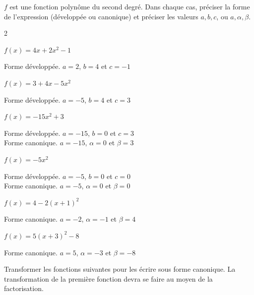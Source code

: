 \documentclass[11pt,a4paper]{article}  %
\begin{document}
$f$ est une fonction polynôme du second degré. Dans chaque cas, préciser la forme de l'expression (développée ou canonique) et préciser les valeurs $a, b, c$, ou $a, \alpha, \beta$.
\begin{multicols}{2}
	\begin{enumMet}
		\item $f(x)=4 x+2 x^2-1$ \quad {}
		\begin{corrBox}
			Forme développée. $a=2$, $b=4$ et $c=-1$
		\end{corrBox}
		\item $f(x)=3+4x-5x^2$ \quad {}
		\begin{corrBox}
			Forme développée. $a=-5$, $b=4$ et $c=3$
		\end{corrBox}
		\item $f(x)=-15 x^2+3$ \quad {}
		\begin{corrBox}
			Forme développée. $a=-15$, $b=0$ et $c=3$\\
			Forme canonique. $a=-15$, $\alpha=0$ et $\beta=3$
		\end{corrBox}
		\item $f(x)=-5 x^2$ \quad {}
		\begin{corrBox}
			Forme développée. $a=-5$, $b=0$ et $c=0$\\
			Forme canonique. $a=-5$, $\alpha=0$ et $\beta=0$
		\end{corrBox}
		\item $f(x)=4-2(x+1)^2$ \quad {}
		\begin{corrBox}
			Forme canonique. $a=-2$, $\alpha=-1$ et $\beta=4$
		\end{corrBox}
		\item $f(x)=5(x+3)^2-8$ \quad {}
		\begin{corrBox}
			Forme canonique. $a=5$, $\alpha=-3$ et $\beta=-8$
		\end{corrBox}
	\end{enumMet}
\end{multicols}
\vspace*{-0.3cm}
Transformer les fonctions suivantes pour les écrire sous forme canonique. La transformation de la première fonction devra se faire au moyen de la factorisation.
\end{document}
